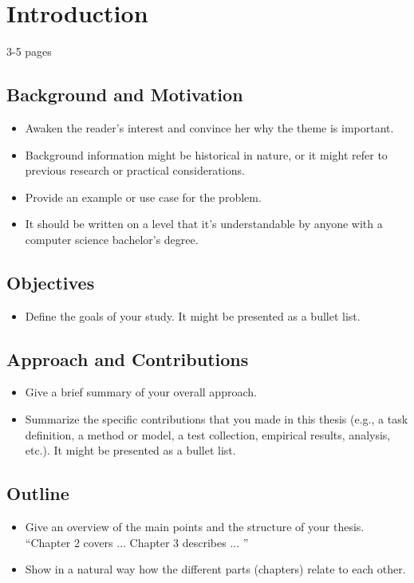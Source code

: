 
\chapter{Introduction}
\label{ch:intro}

3-5 pages

\section{Background and Motivation}
\label{sec:background}
\begin{itemize}
    \item Awaken the reader's interest and convince her why the theme is important.
    \item Background information might be historical in nature, or it might refer to previous research or practical considerations.
    \item Provide an example or use case for the problem.
    \item It should be written on a level that it's understandable by anyone with a computer science bachelor's degree.
\end{itemize}

\section{Objectives}
\label{sec:objectives}
\begin{itemize}
   \item Define the goals of your study. It might be presented as a bullet list.
\end{itemize}


\section{Approach and Contributions}
\label{sec:approach}

\begin{itemize}
  \item Give a brief summary of your overall approach.
  \item Summarize the specific contributions that you made in this thesis (e.g., a task definition, a method or model, a test collection, empirical results, analysis, etc.). It might be presented as a bullet list.
\end{itemize}

\section{Outline}
\begin{itemize}
    \item Give an overview of the main points and the structure of your thesis. ``Chapter 2 covers ... Chapter 3 describes ... ''
    \item Show in a natural way how the different parts (chapters) relate to each other.
\end{itemize}